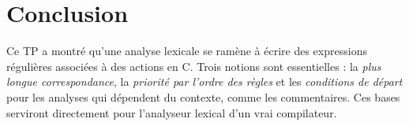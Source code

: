 \documentclass[11pt,a4paper]{article}
\begin{document}
\section{Conclusion}

Ce TP a montré qu'une analyse lexicale se ramène à écrire des expressions régulières associées
à des actions en C. Trois notions sont essentielles : la \emph{plus longue correspondance}, la
\emph{priorité par l'ordre des règles} et les \emph{conditions de départ} pour les analyses qui
dépendent du contexte, comme les commentaires. Ces bases serviront directement pour l'analyseur
lexical d'un vrai compilateur.
\end{document}

